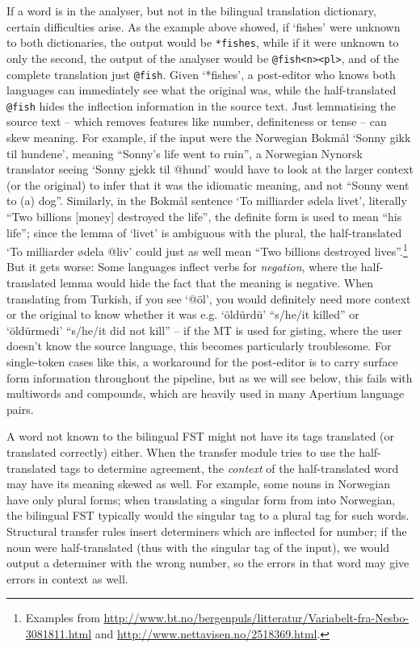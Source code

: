 \documentclass[10pt, a4paper]{article}
\newcommand{\ana}[1]{\texttt{#1}}
\newcommand{\f}[1]{`#1'}
\begin{document}
If a word is in the analyser, but not in the bilingual translation
dictionary, certain difficulties arise. As the example above showed,
if \f{fishes} were unknown to both dictionaries, the output would be
\ana{*fishes}, while if it were unknown to only the second, the output
of the analyser would be \ana{@fish<n><pl>}, and of the complete
translation just \ana{@fish}. Given \f{*fishes}, a post-editor who
knows both languages can immediately see what the original was, while
the half-translated \ana{@fish} hides the inflection information in
the source text. Just lemmatising the source text – which removes
features like number, definiteness or tense – can skew meaning. For
example, if the input were the Norwegian Bokmål \f{Sonny gikk til
  hundene}, meaning ``Sonny's life went to ruin'', a Norwegian Nynorsk
translator seeing \f{Sonny gjekk til @hund} would have to look at the
larger context (or the original) to infer that it was the idiomatic
meaning, and not ``Sonny went to (a) dog''. Similarly, in the Bokmål
sentence \f{To milliarder ødela livet}, literally ``Two billions
[money] destroyed the life'', the definite form is used to mean ``his
life''; since the lemma of \f{livet} is ambiguous with the plural, the
half-translated \f{To milliarder ødela @liv} could just as well mean
``Two billions destroyed lives''.\footnote{Examples from
  \url{http://www.bt.no/bergenpuls/litteratur/Variabelt-fra-Nesbo-3081811.html}
  and
  \url{http://www.nettavisen.no/2518369.html}.}
But it gets worse: Some languages inflect verbs for \emph{negation},
where the half-translated lemma would hide the fact that the meaning
is negative. When translating from Turkish, if you see \f{@öl}, you
would definitely need more context or the original to know whether it
was e.g. \f{öldürdü} ``s/he/it killed'' or \f{öldürmedi} ``s/he/it did
not kill'' – if the MT is used for gisting, where the user doesn't
know the source language, this becomes particularly troublesome. For
single-token cases like this, a workaround for the post-editor is to
carry surface form information throughout the pipeline, but as we will
see below, this fails with multiwords and compounds, which are heavily
used in many Apertium language pairs.

A word not known to the bilingual FST might not have its tags
translated (or translated correctly) either. When the transfer module
tries to use the half-translated tags to determine agreement, the
\emph{context} of the half-translated word may have its meaning skewed
as well. For example, some nouns in Norwegian have only plural forms;
when translating a singular form from into Norwegian, the bilingual
FST typically would the singular tag to a plural tag for such words.
Structural transfer rules insert determiners which are inflected for
number; if the noun were half-translated (thus with the singular tag
of the input), we would output a determiner with the wrong number, so
the errors in that word may give errors in context as well.
\end{document}

